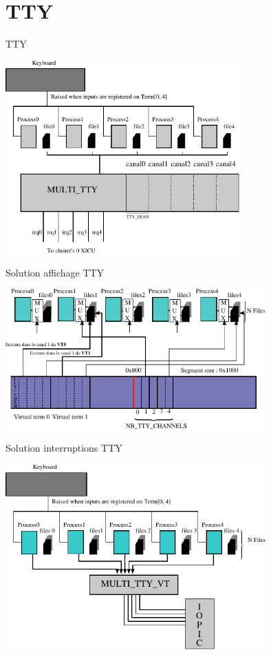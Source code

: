 \documentclass[12pt,francais]{beamer}
\begin{document}
\section*{TTY}
\begin{frame}{TTY}
        \begin{center}
                \includegraphics[width=9cm]{ttys_std.pdf}
        \end{center}
\end{frame}
\begin{frame}{Solution affichage TTY}
        \begin{center}
                \includegraphics[width=10cm]{ttys_adv_w.pdf}
        \end{center}
\end{frame}

\begin{frame}{Solution interruptions TTY}
        \begin{center}
                \includegraphics[width=10cm]{ttys_adv_r.pdf}
        \end{center}
\end{frame}
\end{document}

